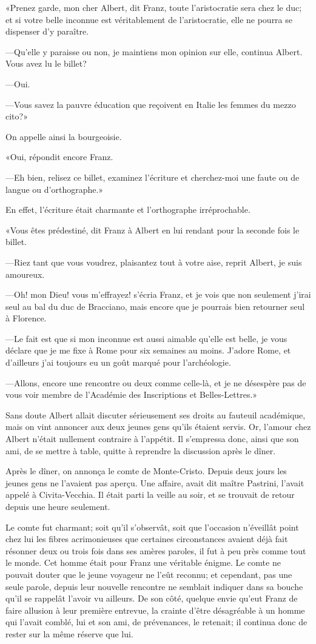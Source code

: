 «Prenez garde, mon cher Albert, dit Franz, toute l'aristocratie sera chez le duc; et si votre belle inconnue est véritablement de l'aristocratie, elle ne pourra se dispenser d'y paraître. 

—Qu'elle y paraisse ou non, je maintiens mon opinion sur elle, continua Albert. Vous avez lu le billet?  

—Oui. 

—Vous savez la pauvre éducation que reçoivent en Italie les femmes du mezzo cito?» 

On appelle ainsi la bourgeoisie. 

«Oui, répondit encore Franz. 

—Eh bien, relisez ce billet, examinez l'écriture et cherchez-moi une faute ou de langue ou d'orthographe.» 

En effet, l'écriture était charmante et l'orthographe irréprochable.  

«Vous êtes prédestiné, dit Franz à Albert en lui rendant pour la seconde fois le billet. 

—Riez tant que vous voudrez, plaisantez tout à votre aise, reprit Albert, je suis amoureux. 

—Oh! mon Dieu! vous m'effrayez! s'écria Franz, et je vois que non seulement j'irai seul au bal du duc de Bracciano, mais encore que je pourrais bien retourner seul à Florence. 

—Le fait est que si mon inconnue est aussi aimable qu'elle est belle, je vous déclare que je me fixe à Rome pour six semaines au moins. J'adore Rome, et d'ailleurs j'ai toujours eu un goût marqué pour l'archéologie. 

—Allons, encore une rencontre ou deux comme celle-là, et je ne désespère pas de vous voir membre de l'Académie des Inscriptions et Belles-Lettres.» 

Sans doute Albert allait discuter sérieusement ses droits au fauteuil académique, mais on vint annoncer aux deux jeunes gens qu'ils étaient servis. Or, l'amour chez Albert n'était nullement contraire à l'appétit. Il s'empressa donc, ainsi que son ami, de se mettre à table, quitte à reprendre la discussion après le dîner. 

Après le dîner, on annonça le comte de Monte-Cristo. Depuis deux jours les jeunes gens ne l'avaient pas aperçu. Une affaire, avait dit maître Pastrini, l'avait appelé à Civita-Vecchia. Il était parti la veille au soir, et se trouvait de retour depuis une heure seulement. 

Le comte fut charmant; soit qu'il s'observât, soit que l'occasion n'éveillât point chez lui les fibres acrimonieuses que certaines circonstances avaient déjà fait résonner deux ou trois fois dans ses amères paroles, il fut à peu près comme tout le monde. Cet homme était pour Franz une véritable énigme. Le comte ne pouvait douter que le jeune voyageur ne l'eût reconnu; et cependant, pas une seule parole, depuis leur nouvelle rencontre ne semblait indiquer dans sa bouche qu'il se rappelât l'avoir vu ailleurs. De son côté, quelque envie qu'eut Franz de faire allusion à leur première entrevue, la crainte d'être désagréable à un homme qui l'avait comblé, lui et son ami, de prévenances, le retenait; il continua donc de rester sur la même réserve que lui. 

